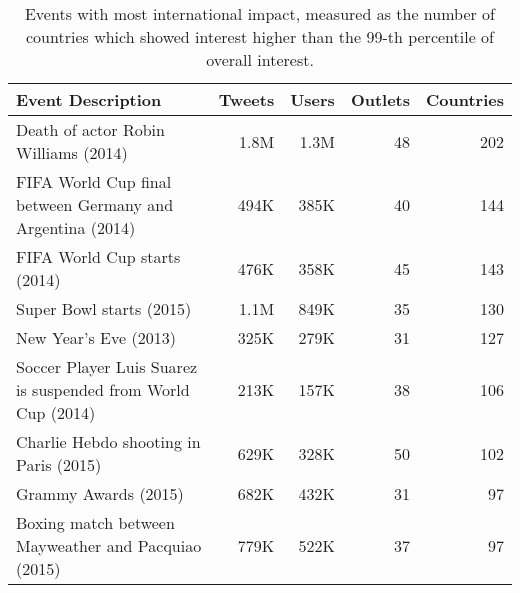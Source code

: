 \begin{table}
\caption{Events with most international impact, measured as the number of countries which showed interest higher than the 99-th percentile of overall interest.}\label{tab:impact}
\centering
{\scriptsize
\begin{tabularx}{\textwidth}{@{}lrrrr@{}}
\toprule
Event Description & Tweets & Users & Outlets & Countries\\
\midrule
Death of actor Robin Williams (2014) & 1.8M & 1.3M & 48 & 202\\
FIFA World Cup final between Germany and Argentina (2014)  & 494K & 385K & 40 & 144\\
FIFA World Cup starts (2014)  & 476K & 358K & 45 &  143\\
Super Bowl starts (2015)  & 1.1M & 849K & 35 & 130\\
New Year's Eve (2013)  & 325K & 279K & 31 & 127\\
Soccer Player Luis Suarez is suspended from World Cup (2014)  & 213K & 157K & 38 & 106\\
Charlie Hebdo shooting in Paris (2015)  & 629K & 328K & 50 & 102\\
Grammy Awards (2015)  & 682K & 432K & 31 & 97\\
Boxing match between Mayweather and Pacquiao (2015)  & 779K & 522K & 37 & 97\\
\bottomrule
\end{tabularx}
}
\end{table}


